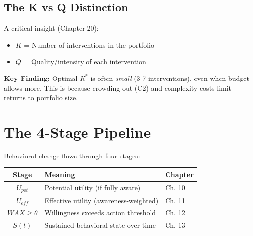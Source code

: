 \subsection{The K vs Q Distinction}
\label{sec:25-kvq}

A critical insight (Chapter 20):
\begin{itemize}
    \item $K$ = Number of interventions in the portfolio
    \item $Q$ = Quality/intensity of each intervention
\end{itemize}

\textbf{Key Finding:} Optimal $K^*$ is often \textit{small} (3-7 interventions), even when budget allows more. This is because crowding-out (C2) and complexity costs limit returns to portfolio size.


\section{The 4-Stage Pipeline}
\label{sec:25-pipeline}

Behavioral change flows through four stages:

\begin{tcolorbox}[colback=blue!5!white,colframe=blue!75!black,
    title=\textbf{The 4-Stage Pipeline}]
\begin{center}
\end{center}

\vspace{0.5em}
\begin{tabular}{|c|l|l|}
\hline
\textbf{Stage} & \textbf{Meaning} & \textbf{Chapter} \\
\hline
$U_{pot}$ & Potential utility (if fully aware) & Ch. 10 \\
$U_{eff}$ & Effective utility (awareness-weighted) & Ch. 11 \\
$WAX \geq \theta$ & Willingness exceeds action threshold & Ch. 12 \\
$S(t)$ & Sustained behavioral state over time & Ch. 13 \\
\hline
\end{tabular}
\end{tcolorbox}

